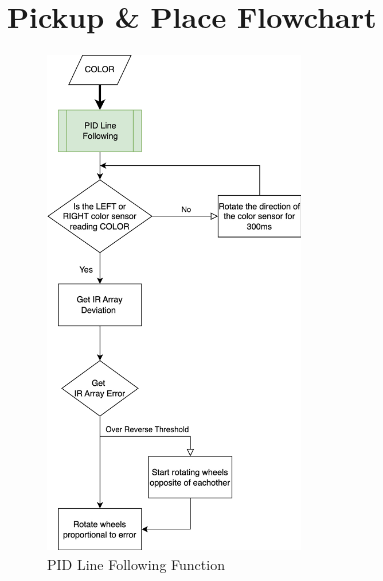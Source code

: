 \documentclass[12pt]{report}
\begin{document}
\section{Pickup \& Place Flowchart}\label{sc:pickup-place-flowchart}

\begin{figure}[H]
    \centering
    \includegraphics[width=0.6\textwidth]{Images/flowchart/pid_line_following.pdf}
    \caption{PID Line Following Function}
    \label{fig:fc:pid_line_following}
\end{figure}
\end{document}
